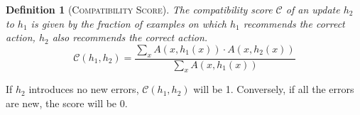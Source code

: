 \documentclass[letterpaper]{article} %
\newcommand{\bug}
    {\mbox{\rule{2mm}{2mm}}}
\newcommand{\Bug}[1]
    {\bug \footnote{BUG: {#1}}}
\newcommand{\?}{\mbox{?}}
\newcommand{\hone}{\mbox{$h_1$}}
\newcommand{\htwo}{\mbox{$h_2$}}
\newcommand{\compatscore}{\mathcal{C}}
\newtheorem*{definition}{Definition}
\begin{document}

\begin{definition} [\textsc{Compatibility Score}]   
The compatibility score $\compatscore$ of an update $\htwo$ to $\hone$ is given by the fraction of examples on which $\hone$ recommends the correct action, $\htwo$ also recommends the correct action.
\begin{equation}
\label{eq:score}
    \compatscore(\hone, \htwo) =  \frac{\sum_{x}A(x, \hone(x)) \cdot A(x, \htwo(x))}{\sum_{x }A(x, \hone(x))}
\end{equation}
\end{definition}
If $\htwo$ introduces no new errors, $\compatscore(\hone, \htwo)$ will be 1. Conversely, if all the errors are new, the score will be 0. 
\end{document}
